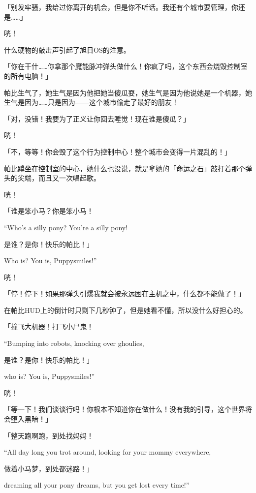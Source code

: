 「别发牢骚，我给过你离开的机会，但是你不听话。我还有个城市要管理，你还是……」

咣！

什么硬物的敲击声引起了旭日OS的注意。

「你在干什……你拿那个魔能脉冲弹头做什么！你疯了吗，这个东西会烧毁控制室的所有电脑！」

帕比生气了，她生气是因为他把她当傻瓜耍，她生气是因为他说她是一个机器，她生气是因为……只是因为——这个城市偷走了最好的朋友！

「对，没错！我要为了正义让你回去睡觉！现在谁是傻瓜？」

咣！

「不，等等！你会毁了这个行为控制中心！整个城市会变得一片混乱的！」

帕比蹲坐在控制室的中心，她什么也没说，就是拿她的「命运之石」敲打着那个弹头的尖端，而且又一次唱起歌。

咣！

\begin{song}
「谁是笨小马？你是笨小马！

``Who's a silly pony? You're a silly pony!

\medskip

是谁？是你！快乐的帕比！」

Who is? You is, Puppysmiles!''
\end{song}

咣！

「停！停下！如果那弹头引爆我就会被永远困在主机之中，什么都不能做了！」

在帕比HUD上的倒计时只剩下几秒钟了，但是她看不懂，所以没什么好担心的。

\begin{song}
「撞飞大机器！打飞小尸鬼！

``Bumping into robots, knocking over ghoulies,

\medskip

是谁？是你！快乐的帕比！」

who is? You is, Puppysmiles!''
\end{song}

咣！

「等一下！我们谈谈行吗！你根本不知道你在做什么！没有我的引导，这个世界将会堕入黑暗！」

\begin{song}
「整天跑啊跑，到处找妈妈！

``All day long you trot around, looking for your mommy everywhere,

\medskip

做着小马梦，到处都迷路！」

dreaming all your pony dreams, but you get lost every time!''
\end{song}

